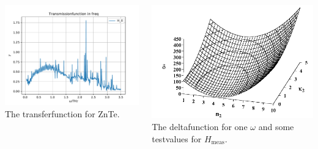 \documentclass[aspectratio=1610, 9pt]{beamer}
\begin{document}
\begin{frame}
  \begin{columns}
    \begin{column}{0.5\textwidth}
      \begin{centering}
        \includegraphics[width=\textwidth]{images/Transmissionfunction.pdf}
        {The transferfunction for ZnTe.}
      \end{centering}
    \end{column}
    \begin{column}{0.5\textwidth}
      \begin{centering}
        \includegraphics[width=\textwidth]{images/delta.png}
        {The deltafunction for one $\omega$ and some testvalues for $H_\text{meas}$.}
      \end{centering}
    \end{column}
  \end{columns}
\end{frame}
\end{document}
